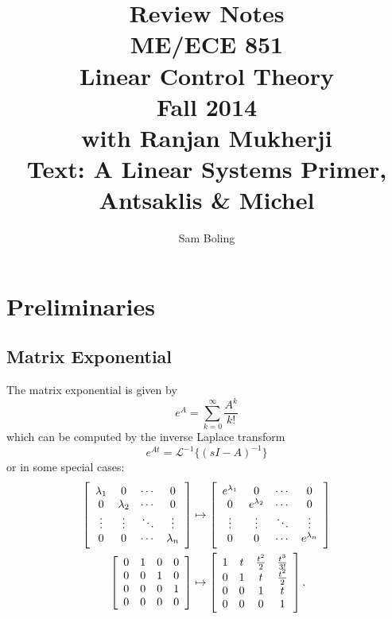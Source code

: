 \documentclass{report}
\author{Sam Boling}
\title{
  Review Notes \\
  ME/ECE 851 \\
  Linear Control Theory \\
  Fall 2014 \\
  with Ranjan Mukherji \\
  Text: A Linear Systems Primer, Antsaklis \& Michel
}
\begin{document}
\begin{titlepage}
\maketitle
\end{titlepage}

\section{Preliminaries}

\subsection{Matrix Exponential}
The matrix exponential is given by
$$
e^{A} = \sum_{k=0}^\infty \frac{A^k}{k!}
$$
which can be computed by the inverse Laplace transform
$$
e^{At} = \mathcal{L}^{-1}\{(sI - A)^{-1}\}
$$
or in some special cases:
\begin{align*}
\left[\begin{array}{c c c c}
  \lambda_1 & 0          & \cdots & 0      \\
  0         & \lambda_2  & \cdots & 0      \\
  \vdots    & \vdots     & \ddots & \vdots \\
  0         & 0          & \cdots & \lambda_n
\end{array}\right]
& \mapsto
\left[\begin{array}{c c c c}
  e^{\lambda_1} & 0           & \cdots & 0      \\
  0           & e^{\lambda_2} & \cdots & 0      \\
  \vdots      & \vdots      & \ddots & \vdots \\
  0           & 0           & \cdots & e^{\lambda_n}
\end{array}\right] \\
\left[\begin{array}{c c c c c}
  0 & 1 & 0 & 0 \\
  0 & 0 & 1 & 0 \\
  0 & 0 & 0 & 1 \\
  0 & 0 & 0 & 0
\end{array}\right]
& \mapsto
\left[\begin{array}{c c c c}
  1 & t & \frac{t^2}{2} & \frac{t^3}{3!} \\
  0 & 1 & t             & \frac{t^2}{2}  \\
  0 & 0 & 1             & t              \\
  0 & 0 & 0             & 1
\end{array}\right].
\end{align*}
\end{document}
